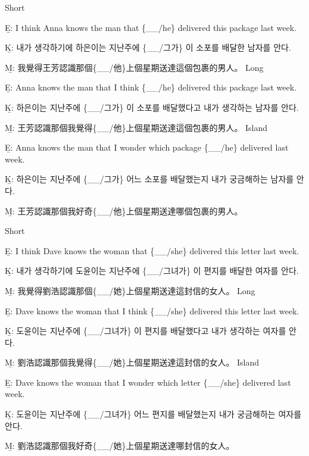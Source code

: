 \pex %
\a Short\par\nobreak
\beginsubsub
\b{E:} I think Anna knows the man that \{\_\_/he\} delivered this package last week.\par\nobreak
\b{K:} \ko 내가 생각하기에 하은이는 지난주에 \{\_\_/그가\} 이 소포를 배달한 남자를 안다. \normalfont\par\nobreak
\b{M:} \zh 我覺得王芳認識那個\{\_\_/他\}上個星期送達這個包裹的男人。 \normalfont
\endsubsub
\a Long\par\nobreak
\beginsubsub
\b{E:} Anna knows the man that I think \{\_\_/he\} delivered this package last week.\par\nobreak
\b{K:} \ko 하은이는 지난주에 \{\_\_/그가\} 이 소포를 배달했다고 내가 생각하는 남자를 안다. \normalfont\par\nobreak
\b{M:} \zh 王芳認識那個我覺得\{\_\_/他\}上個星期送達這個包裹的男人。 \normalfont
\endsubsub
\a Island\par\nobreak
\beginsubsub
\b{E:} Anna knows the man that I wonder which package \{\_\_/he\} delivered last week.\par\nobreak
\b{K:} \ko 하은이는 지난주에 \{\_\_/그가\} 어느 소포를 배달했는지 내가 궁금해하는 남자를 안다\normalfont.\par\nobreak
\b{M:} \zh 王芳認識那個我好奇\{\_\_/他\}上個星期送達哪個包裹的男人。\normalfont
\endsubsub
\xe

\pex %
\a Short\par\nobreak
\beginsubsub
\b{E:} I think Dave knows the woman that \{\_\_/she\} delivered this letter last week.\par\nobreak
\b{K:} \ko 내가 생각하기에 도윤이는 지난주에 \{\_\_/그녀가\} 이 편지를 배달한 여자를 안다. \normalfont\par\nobreak
\b{M:} \zh 我覺得劉浩認識那個\{\_\_/她\}上個星期送達這封信的女人。 \normalfont
\endsubsub
\a Long\par\nobreak
\beginsubsub
\b{E:} Dave knows the woman that I think \{\_\_/she\} delivered this letter last week.\par\nobreak
\b{K:} \ko 도윤이는 지난주에 \{\_\_/그녀가\} 이 편지를 배달했다고 내가 생각하는 여자를 안다. \normalfont\par\nobreak
\b{M:} \zh 劉浩認識那個我覺得\{\_\_/她\}上個星期送達這封信的女人。 \normalfont
\endsubsub
\a Island\par\nobreak
\beginsubsub
\b{E:} Dave knows the woman that I wonder which letter \{\_\_/she\} delivered last week.\par\nobreak
\b{K:} \ko 도윤이는 지난주에 \{\_\_/그녀가\} 어느 편지를 배달했는지 내가 궁금해하는 여자를 안다\normalfont.\par\nobreak
\b{M:} \zh 劉浩認識那個我好奇\{\_\_/她\}上個星期送達哪封信的女人。\normalfont
\endsubsub
\xe

